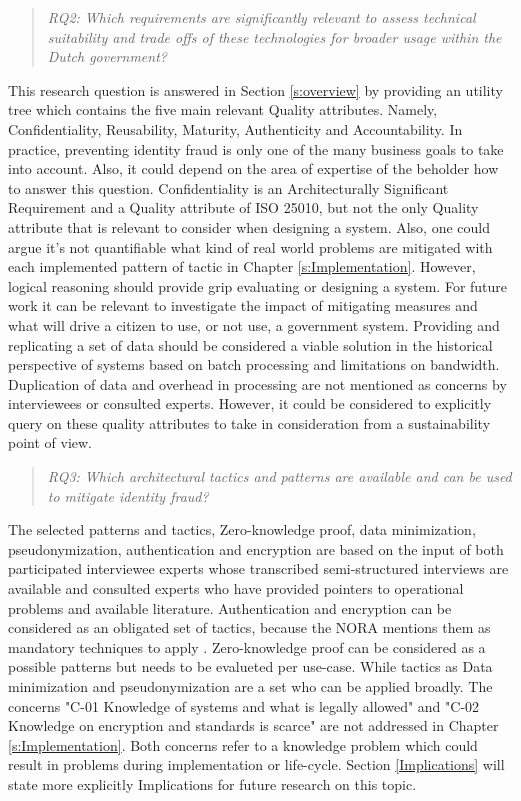 \begin{quote}\emph{RQ2: Which requirements are significantly relevant to assess technical suitability and trade offs of these technologies for broader usage within the Dutch government?}\end{quote}
This research question is answered in Section \ref{s:overview} by providing an utility tree which contains the five main relevant Quality attributes. Namely, Confidentiality, Reusability, Maturity, Authenticity and Accountability. In practice, preventing identity fraud is only one of the many business goals to take into account. Also, it could depend on the area of expertise of the beholder how to answer this question. Confidentiality is an Architecturally Significant Requirement and a Quality attribute of ISO 25010, but not the only Quality attribute that is relevant to consider when designing a system. Also, one could argue it's not quantifiable what kind of real world problems are mitigated with each implemented pattern of tactic in Chapter \ref{s:Implementation}. However, logical reasoning should provide grip evaluating or designing a system. For future work it can be relevant to investigate the impact of mitigating measures and what will drive a citizen to use, or not use, a government system. Providing and replicating a set of data should be considered a viable solution in the historical perspective of systems based on batch processing and limitations on bandwidth. Duplication of data and overhead in processing are not mentioned as concerns by interviewees or consulted experts. However, it could be considered to explicitly query on these quality attributes to take in consideration from a sustainability point of view.

\begin{quote}\emph{RQ3: Which architectural tactics and patterns are available and can be used to mitigate identity fraud?}\end{quote}
The selected patterns and tactics, Zero-knowledge proof, data minimization, pseudonymization, authentication and encryption are based on the input of both participated interviewee experts whose transcribed semi-structured interviews are available and consulted experts who have provided pointers to operational problems and available literature. Authentication and encryption can be considered as an obligated set of tactics, because the NORA mentions them as mandatory techniques to apply \cite{NORA_PasToeOfLegUit}. Zero-knowledge proof can be considered as a possible patterns but needs to be evalueted per use-case. While tactics as Data minimization and pseudonymization are a set who can be applied broadly. The concerns "C-01 Knowledge of systems and what is legally allowed" and "C-02 Knowledge on encryption and standards is scarce" are not addressed in Chapter \ref{s:Implementation}. Both concerns refer to a knowledge problem which could result in problems during implementation or life-cycle. Section \ref{Implications} will state more explicitly Implications for future research on this topic.